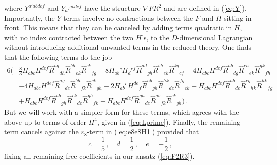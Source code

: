 \documentclass[a4paper,11pt]{article}
\begin{document}
where $Y^{a'abdef}$ and $Y_{a'}{}^{abdef}$ have the structure $\nabla FR^2$ and are defined in (\ref{eq:Y}). Importantly, the $Y$-terms involve no contractions between the $F$ and $H$ sitting in front. This means that they can be canceled by adding terms quadratic in $H$, with no index contracted between the two $H$'s, to the $D$-dimensional Lagrangian without introducing additional unwanted terms in the reduced theory. One finds that the following terms do the job
\begin{align}
6\Big(&
\frac83H_{abc}H^{def}\hat R^{ag}{}_{dh}\hat R^{bh}{}_{ek}\hat R^{ck}{}_{fg}
+8H_{ab}{}^cH_d{}^{ef}\hat R^{ad}{}_{gh}\hat R^{bh}{}_{ek}\hat R^{kg}{}_{cf}
%
-4H_{abc}H^{def}\hat R^{ab}{}_{dg}\hat R^{ch}{}_{ek}\hat R^{gk}{}_{fh}
\nonumber\\
&
-4H_{abc}H^{def}\hat R^{ag}{}_{de}\hat R^{bh}{}_{fk}\hat R^{ck}{}_{gh}
%
-2H_{ab}{}^cH^{de}{}_f\hat R^{ab}{}_{gh}\hat R^{hk}{}_{de}\hat R^{fg}{}_{ck}
%
+H_{abc}H^{def}\hat R^{ab}{}_{de}\hat R^{cg}{}_{hk}\hat R^{hk}{}_{fg}
%
\nonumber\\
&
+H_{abc}H^{def}\hat R^{ab}{}_{gh}\hat R^{ck}{}_{de}\hat R^{gh}{}_{fk}
+H_{abc}H^{def}\hat R^{gh}{}_{de}\hat R^{ab}{}_{fk}\hat R^{ck}{}_{gh}
\Big)\,.
\nonumber
%
%
\end{align}
But we will work with a simpler form for these terms, which agrees with the above up to terms of order $H^4$, given in (\ref{eq:Lprime}). Finally, the remaining term cancels against the $\varepsilon_8$-term in (\ref{eq:e8e8H1}) provided that
\begin{equation}
c=\frac15\,,\quad d=\frac12\,,\quad e=-\frac12\,,
\end{equation}
fixing all remaining free coefficients in our ansatz (\ref{eq:F2R3}).
\end{document}
